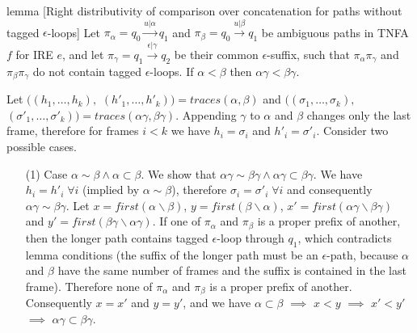 \documentclass[AMA,STIX1COL]{WileyNJD-v2}
\begin{document}
\begin{theoremEnd}[restate, no link to proof, no link to theorem, category=lemmata_closure]{lemma}
[Right distributivity of comparison over concatenation for paths without tagged $\epsilon$-loops]
    \label{lemma_closure_rightdist}
    Let
    $\pi_\alpha = q_0 \overset {u | \alpha} {\longrightarrow} q_1$ and
    $\pi_\beta  = q_0 \overset {u | \beta}  {\longrightarrow} q_1$
    be ambiguous paths in TNFA $f$ for IRE $e$,
    and let $\pi_\gamma = q_1 \overset {\epsilon | \gamma} {\longrightarrow} q_2$
    be their common $\epsilon$-suffix,
    such that $\pi_\alpha \pi_\gamma$ and $\pi_\beta \pi_\gamma$ do not contain tagged $\epsilon$-loops.
    If $\alpha < \beta$ then $\alpha \gamma < \beta \gamma$.
\end{theoremEnd}
\begin{proofEnd}
    Let
    $\big( (h_1, \hdots, h_k),$ $(h'_1, \hdots, h'_k) \big) = traces (\alpha, \beta)$ and
    $\big( (\sigma_1, \hdots, \sigma_k),$ $(\sigma'_1, \hdots, \sigma'_k) \big) = traces (\alpha \gamma, \beta \gamma)$.
    Appending $\gamma$ to $\alpha$ and $\beta$ changes only the last frame, therefore
    for frames $i < k$ we have $h_i = \sigma_i$ and $h'_i = \sigma'_i$.
    Consider two possible cases.
    \begin{itemize}[itemsep=0.2em, topsep=0.5em]
    \item[(1)]
        Case $\alpha \sim \beta \wedge \alpha \subset \beta$.
        We show that $\alpha \gamma \sim \beta \gamma \wedge \alpha \gamma \subset \beta \gamma$.
        We have $h_i = h'_i \; \forall i$ (implied by $\alpha \sim \beta$), therefore
        $\sigma_i = \sigma'_i \; \forall i$ and consequently $\alpha \gamma \sim \beta \gamma$.
        Let
        $x = first (\alpha \backslash \beta)$,
        $y = first (\beta \backslash \alpha)$,
        $x' = first (\alpha \gamma \backslash \beta \gamma)$ and
        $y' = first (\beta \gamma \backslash \alpha \gamma)$.
        If one of $\pi_\alpha$ and $\pi_\beta$ is a proper prefix of another,
        then the longer path contains tagged $\epsilon$-loop through $q_1$,
        which contradicts lemma conditions
        (the suffix of the longer path must be an $\epsilon$-path,
        because $\alpha$ and $\beta$ have the same number of frames
        and the suffix is contained in the last frame).
        Therefore none of $\pi_\alpha$ and $\pi_\beta$ is a proper prefix of another.
        Consequently $x = x'$ and $y = y'$, and we have
        $\alpha \subset \beta$
        $\implies$
        $x < y$
        $\implies$
        $x' < y'$
        $\implies$
        $\alpha \gamma \subset \beta \gamma$.


\end{itemize}
\end{proofEnd}
\end{document}

